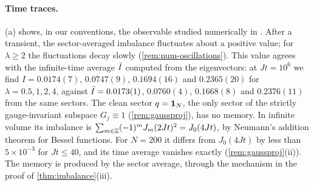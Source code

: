 \paragraph{Time traces.}  (a) shows, in our conventions, the observable studied numerically
in \cite{SKKM2017}.  After a transient, the sector-averaged imbalance fluctuates about a positive value; for
$\lambda\ge2$ the fluctuations decay slowly (\cref{rem:num-oscillations}).  This value agrees with the infinite-time average $\bar I$ computed from the eigenvectors: at $Jt=10^6$ we find
$I=0.0174(7)$, $0.0747(9)$, $0.1694(16)$ and $0.2365(20)$ for $\lambda=0.5,1,2,4$, against $\bar I=0.0173(1)$,
$0.0760(4)$, $0.1668(8)$ and $0.2376(11)$ from the same sectors.  The clean sector $q=\mathbf{1}_N$, the only sector of
the strictly gauge-invariant subspace $G_j\equiv1$ (\cref{rem:gaussproj}), has no memory.  In infinite volume its
imbalance is $\sum_{m\in\mathbb{Z}}(-1)^mJ_m(2Jt)^2=J_0(4Jt)$, by Neumann's addition theorem for Bessel functions.  For
$N=200$ it differs from $J_0(4Jt)$ by less than $5\times10^{-3}$ for $Jt\le40$, and its time average vanishes
exactly (\cref{rem:gaussproj}(ii)).  The memory is produced by the sector average, through the mechanism in the
proof of \cref{thm:imbalance}(iii).

